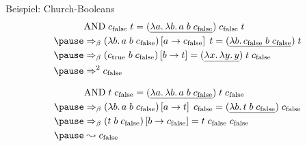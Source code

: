 \documentclass{beamer}
\begin{document}
\begin{frame}{Beispiel: Church-Booleans}
  \begin{eqnarray*}
    &\app{\app{\cand}{\cfalse}}{t} = \app{\app{(\uline{\lam{a}{\lam{b}{\app{\app{a}{b}}{\cfalse}}}})}{\cfalse}}{t} \\
    \pause
    &\Rightarrow_\beta \app{(\lam{b}{\app{\app{a}{b}}{\cfalse}})\left[ a \to \cfalse \right]}{t} = \app{(\uline{\lam{b}{\app{\app{\cfalse}{b}}{\cfalse}}})}{t} \\
    \pause
    &\Rightarrow_\beta (\app{\app{\ctrue}{b}}{\cfalse}) \left[ b \to t \right] = \app{\app{(\uline{\lam{x}{\lam{y}{y}}})}{t}}{\cfalse} \\
    \pause
    &\Rightarrow^2 \cfalse
  \end{eqnarray*}

  \begin{eqnarray*}
    &\app{\app{\cand}{t}}{\cfalse} = \app{\app{(\uline{\lam{a}{\lam{b}{\app{\app{a}{b}}{\cfalse}}}})}{t}}{\cfalse} \\
    \pause
    &\Rightarrow_\beta \app{(\lam{b}{\app{\app{a}{b}}{\cfalse}})\left[ a \to t \right]}{\cfalse} = \app{(\uline{\lam{b}{\app{\app{t}{b}}{\cfalse}}})}{\cfalse} \\
    \pause
    &\Rightarrow_\beta (\app{\app{t}{b}}{\cfalse}) \left[ b \to \cfalse \right] = \app{\app{t}{\cfalse}}{\cfalse} \\
    \pause
    &\leadsto \cfalse
  \end{eqnarray*}
\end{frame}
\end{document}
